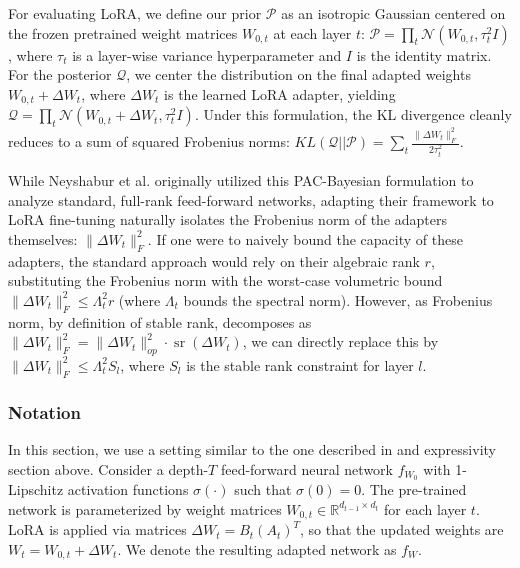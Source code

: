 \documentclass[a4paper,14pt]{extarticle}
\DeclareMathOperator{\sr}{sr}
\begin{document}
    For evaluating LoRA, we define our prior $\mathcal{P}$ as an isotropic Gaussian centered on the frozen pretrained weight matrices $W_{0,t}$ at each layer $t$: $\mathcal{P} = \prod_t \mathcal{N}(W_{0,t}, \tau_t^2 I)$, where $\tau_t$ is a layer-wise variance hyperparameter and $I$ is the identity matrix. For the posterior $\mathcal{Q}$, we center the distribution on the final adapted weights $W_{0,t} + \Delta W_t$, where $\Delta W_t$ is the learned LoRA adapter, yielding $\mathcal{Q} = \prod_t \mathcal{N}(W_{0,t} + \Delta W_t, \tau_t^2 I)$. Under this formulation, the KL divergence cleanly reduces to a sum of squared Frobenius norms: $KL(\mathcal{Q} || \mathcal{P}) = \sum_t \frac{\|\Delta W_t\|_F^2}{2\tau_t^2}$.

    While Neyshabur et al. \cite{neyshabur2017pac} originally utilized this PAC-Bayesian formulation to analyze standard, full-rank feed-forward networks, adapting their framework to LoRA fine-tuning naturally isolates the Frobenius norm of the adapters themselves: $\|\Delta W_t\|_F^2$. If one were to naively bound the capacity of these adapters, the standard approach would rely on their algebraic rank $r$, substituting the Frobenius norm with the worst-case volumetric bound $\|\Delta W_t\|_F^2 \leq \Lambda_t^2 r$ (where $\Lambda_t$ bounds the spectral norm). However, as Frobenius norm, by definition of stable rank, decomposes as $\|\Delta W_t\|_F^2 = \|\Delta W_t\|_{op}^2 \cdot \sr(\Delta W_t)$, we can directly replace this by $\|\Delta W_t\|_F^2 \leq \Lambda_t^2 S_l$, where $S_l$ is the stable rank constraint for layer $l$. 

    

    \subsubsection{Notation}
    
    In this section, we use a setting similar to the one described in \cite{kratsios2025sharpgeneralizationboundsfoundation} and expressivity section above. Consider a depth-$T$ feed-forward neural network $f_{W_0}$ with 1-Lipschitz activation functions $\sigma(\cdot)$ such that $\sigma(0) = 0$. The pre-trained network is parameterized by weight matrices $W_{0,t} \in \mathbb{R}^{d_{t-1}\times d_{t}}$ for each layer $t$.
    LoRA is applied via matrices $\Delta W_t = B_t(A_t)^T$, so that the updated weights are $W_t = W_{0,t} + \Delta W_t$. We denote the resulting adapted network as $f_W$. 
\end{document}
